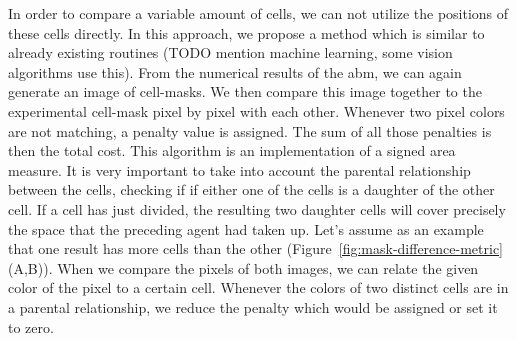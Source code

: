 \documentclass{article}
\begin{document}
In order to compare a variable amount of cells, we can not utilize the positions of these cells
directly.
In this approach, we propose a method which is similar to already existing routines (TODO mention
machine learning, some vision algorithms use this).
From the numerical results of the \ac{abm}, we can again generate an image of cell-masks.
We then compare this image together to the experimental cell-mask pixel by pixel with each other.
Whenever two pixel colors are not matching, a penalty value is assigned.
The sum of all those penalties is then the total cost.
This algorithm is an implementation of a signed area measure.
It is very important to take into account the parental relationship between the cells, checking if
if either one of the cells is a daughter of the other cell.
If a cell has just divided, the resulting two daughter cells will cover precisely the space that the
preceding agent had taken up.
Let's assume as an example that one result has more cells than the other
(Figure~\ref{fig:mask-difference-metric} (A,B)).
When we compare the pixels of both images, we can relate the given color of the pixel to a certain
cell.
Whenever the colors of two distinct cells are in a parental relationship, we reduce the penalty
which would be assigned or set it to zero.
\end{document}
